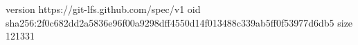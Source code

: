 version https://git-lfs.github.com/spec/v1
oid sha256:2f0c682dd2a5836e96f00a9298dff4550d14f013488c339ab5ff0f53977d6db5
size 121331
